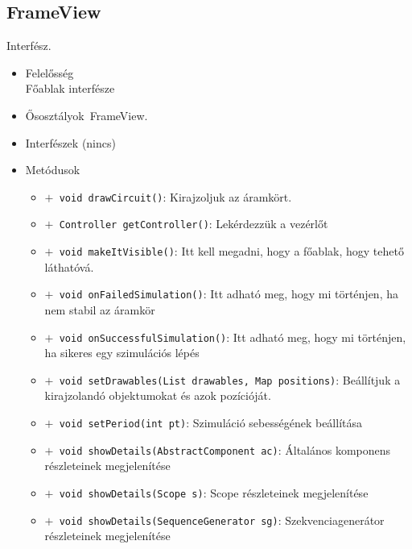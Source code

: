 \subsection{FrameView}
Interfész.
\begin{itemize}
\item Felelősség\\
Főablak interfésze
\item Ősosztályok\ FrameView.
\item Interfészek (nincs)
\item Metódusok$\ $
\begin{itemize}
	\item[] \texttt{$+$ void drawCircuit()}: Kirajzoljuk az áramkört.
	\item[] \texttt{$+$ Controller getController()}: Lekérdezzük a vezérlőt
	\item[] \texttt{$+$ void makeItVisible()}: Itt kell megadni, hogy a főablak, hogy tehető láthatóvá.
	\item[] \texttt{$+$ void onFailedSimulation()}: Itt adható meg, hogy mi történjen, ha nem stabil az áramkör
	\item[] \texttt{$+$ void onSuccessfulSimulation()}: Itt adható meg, hogy mi történjen, ha sikeres egy szimulációs lépés
	\item[] \texttt{$+$ void setDrawables(List drawables, Map positions)}: Beállítjuk a kirajzolandó objektumokat és azok pozícióját.
	\item[] \texttt{$+$ void setPeriod(int pt)}: Szimuláció sebességének beállítása
	\item[] \texttt{$+$ void showDetails(AbstractComponent ac)}: 
Általános komponens részleteinek megjelenítése
	\item[] \texttt{$+$ void showDetails(Scope s)}: 
Scope részleteinek megjelenítése
	\item[] \texttt{$+$ void showDetails(SequenceGenerator sg)}: 
Szekvenciagenerátor részleteinek megjelenítése
\end{itemize}
\end{itemize}

